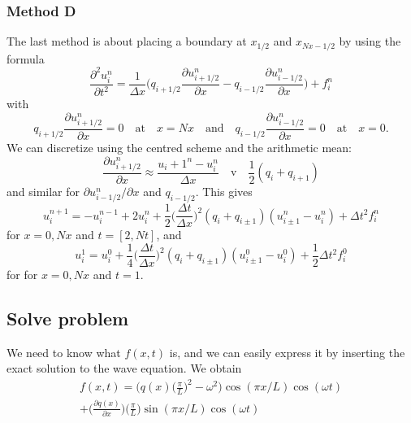\documentclass[norsk,a4paper,12pt]{article}
\begin{document}
\subsubsection{Method D}
The last method is about placing a boundary at $x_{1/2}$ and $x_{Nx-1/2}$ by using the formula
\begin{equation}
\frac{\partial^2 u_i^n}{\partial t^2}=\frac{1}{\Delta x}\bigg(q_{i+1/2}\frac{\partial u_{i+1/2}^n}{\partial x}-q_{i-1/2}\frac{\partial u_{i-1/2}^n}{\partial x}\bigg)+f_i^n
\end{equation}
with 
\begin{equation*}
q_{i+1/2}\frac{\partial u_{i+1/2}^n}{\partial x}=0 \quad\text{at}\quad x=Nx\quad\text{and}\quad q_{i-1/2}\frac{\partial u_{i-1/2}^n}{\partial x}=0 \quad\text{at}\quad x=0.
\end{equation*}
We can discretize using the centred scheme and the arithmetic mean:
\begin{equation*}\frac{\partial u_{i+1/2}^n}{\partial x}\approx\frac{u_i+1^n-u_i^n}{\Delta x}\quad\text{v}\quad\frac{1}{2}(q_{i}+q_{i+1})
\end{equation*}
and similar for $\partial u_{i-1/2}^n/\partial x$ and $q_{i-1/2}$.
This gives 
\begin{equation}
u_i^{n+1}=-u_i^{n-1}+2u_i^n+\frac{1}{2}\bigg(\frac{\Delta t}{\Delta x}\bigg)^2(q_i+q_{i\pm1})(u_{i\pm1}^n-u_i^n)+\Delta t^2f_i^n
\end{equation}
for $x=0,Nx$ and $t=[2,Nt]$, and
\begin{equation}
u_i^1=u_i^0+\frac{1}{4}\bigg(\frac{\Delta t}{\Delta x}\bigg)^2(q_i+q_{i\pm1})(u_{i\pm1}^0-u_i^0)+\frac{1}{2}\Delta t^2f_i^0
\end{equation}
for for $x=0,Nx$ and $t=1$.

\subsection{Solve problem}
We need to know what $f(x,t)$ is, and we can easily express it by inserting the exact solution to the wave equation. We obtain
\begin{equation}
\begin{split}
f(x,t)=\Bigg(q(x)\bigg(\frac{\pi}{L}\bigg)^2-\omega^2\Bigg)\cos(\pi x/L)\cos(\omega t)\\
+\bigg(\frac{\partial q(x)}{\partial x}\bigg)\bigg(\frac{\pi}{L}\bigg)\sin(\pi x/L)\cos(\omega t)
\end{split}
\end{equation}
\end{document}

